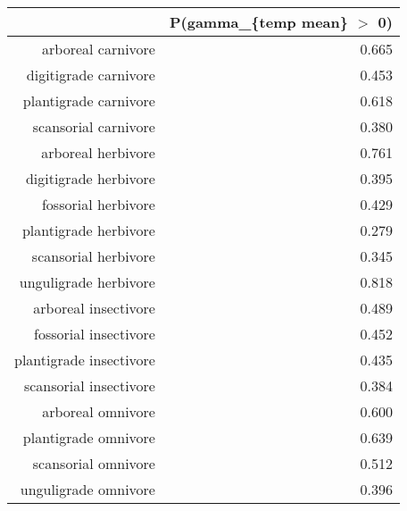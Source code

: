 \begin{table}[ht]
\centering
\begin{tabular}{rr}
  \hline
 & P(gamma\_\{temp mean\} $>$ 0) \\ 
  \hline
arboreal carnivore & 0.665 \\ 
  digitigrade carnivore & 0.453 \\ 
  plantigrade carnivore & 0.618 \\ 
  scansorial carnivore & 0.380 \\ 
  arboreal herbivore & 0.761 \\ 
  digitigrade herbivore & 0.395 \\ 
  fossorial herbivore & 0.429 \\ 
  plantigrade herbivore & 0.279 \\ 
  scansorial herbivore & 0.345 \\ 
  unguligrade herbivore & 0.818 \\ 
  arboreal insectivore & 0.489 \\ 
  fossorial insectivore & 0.452 \\ 
  plantigrade insectivore & 0.435 \\ 
  scansorial insectivore & 0.384 \\ 
  arboreal omnivore & 0.600 \\ 
  plantigrade omnivore & 0.639 \\ 
  scansorial omnivore & 0.512 \\ 
  unguligrade omnivore & 0.396 \\ 
   \hline
\end{tabular}
\label{tab:surv_temp}
\end{table}
